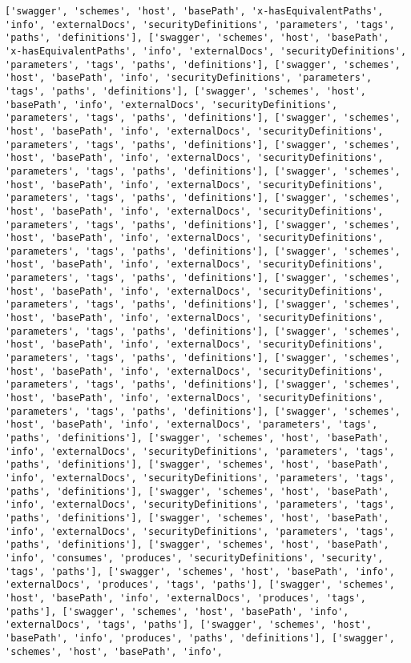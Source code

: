 \documentclass[11pt]{article}
\begin{document}
\begin{Verbatim}[commandchars=\\\{\}]
['swagger', 'schemes', 'host', 'basePath', 'x-hasEquivalentPaths', 'info', 'externalDocs', 'securityDefinitions', 'parameters', 'tags', 'paths', 'definitions'], ['swagger', 'schemes', 'host', 'basePath', 'x-hasEquivalentPaths', 'info', 'externalDocs', 'securityDefinitions', 'parameters', 'tags', 'paths', 'definitions'], ['swagger', 'schemes', 'host', 'basePath', 'info', 'securityDefinitions', 'parameters', 'tags', 'paths', 'definitions'], ['swagger', 'schemes', 'host', 'basePath', 'info', 'externalDocs', 'securityDefinitions', 'parameters', 'tags', 'paths', 'definitions'], ['swagger', 'schemes', 'host', 'basePath', 'info', 'externalDocs', 'securityDefinitions', 'parameters', 'tags', 'paths', 'definitions'], ['swagger', 'schemes', 'host', 'basePath', 'info', 'externalDocs', 'securityDefinitions', 'parameters', 'tags', 'paths', 'definitions'], ['swagger', 'schemes', 'host', 'basePath', 'info', 'externalDocs', 'securityDefinitions', 'parameters', 'tags', 'paths', 'definitions'], ['swagger', 'schemes', 'host', 'basePath', 'info', 'externalDocs', 'securityDefinitions', 'parameters', 'tags', 'paths', 'definitions'], ['swagger', 'schemes', 'host', 'basePath', 'info', 'externalDocs', 'securityDefinitions', 'parameters', 'tags', 'paths', 'definitions'], ['swagger', 'schemes', 'host', 'basePath', 'info', 'externalDocs', 'securityDefinitions', 'parameters', 'tags', 'paths', 'definitions'], ['swagger', 'schemes', 'host', 'basePath', 'info', 'externalDocs', 'securityDefinitions', 'parameters', 'tags', 'paths', 'definitions'], ['swagger', 'schemes', 'host', 'basePath', 'info', 'externalDocs', 'securityDefinitions', 'parameters', 'tags', 'paths', 'definitions'], ['swagger', 'schemes', 'host', 'basePath', 'info', 'externalDocs', 'securityDefinitions', 'parameters', 'tags', 'paths', 'definitions'], ['swagger', 'schemes', 'host', 'basePath', 'info', 'externalDocs', 'securityDefinitions', 'parameters', 'tags', 'paths', 'definitions'], ['swagger', 'schemes', 'host', 'basePath', 'info', 'externalDocs', 'securityDefinitions', 'parameters', 'tags', 'paths', 'definitions'], ['swagger', 'schemes', 'host', 'basePath', 'info', 'externalDocs', 'parameters', 'tags', 'paths', 'definitions'], ['swagger', 'schemes', 'host', 'basePath', 'info', 'externalDocs', 'securityDefinitions', 'parameters', 'tags', 'paths', 'definitions'], ['swagger', 'schemes', 'host', 'basePath', 'info', 'externalDocs', 'securityDefinitions', 'parameters', 'tags', 'paths', 'definitions'], ['swagger', 'schemes', 'host', 'basePath', 'info', 'externalDocs', 'securityDefinitions', 'parameters', 'tags', 'paths', 'definitions'], ['swagger', 'schemes', 'host', 'basePath', 'info', 'externalDocs', 'securityDefinitions', 'parameters', 'tags', 'paths', 'definitions'], ['swagger', 'schemes', 'host', 'basePath', 'info', 'consumes', 'produces', 'securityDefinitions', 'security', 'tags', 'paths'], ['swagger', 'schemes', 'host', 'basePath', 'info', 'externalDocs', 'produces', 'tags', 'paths'], ['swagger', 'schemes', 'host', 'basePath', 'info', 'externalDocs', 'produces', 'tags', 'paths'], ['swagger', 'schemes', 'host', 'basePath', 'info', 'externalDocs', 'tags', 'paths'], ['swagger', 'schemes', 'host', 'basePath', 'info', 'produces', 'paths', 'definitions'], ['swagger', 'schemes', 'host', 'basePath', 'info', 
\end{Verbatim}
\end{document}
